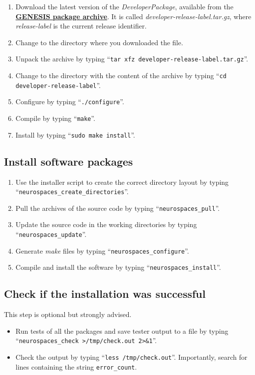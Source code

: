 \documentclass[12pt]{article}
\begin{document}
\begin{enumerate}
   \item Download the latest version of the {\it DeveloperPackage}, available from the \href{http://repo-genesis3.cbi.utsa.edu/src/}{\bf GENESIS package archive}. It is called {\it developer-release-label.tar.gz}, where {\it release-label} is the current release identifier.
   \item Change to the directory where you downloaded the file.
   \item Unpack the archive by typing ``{\tt tar xfz developer-release-label.tar.gz}''.
   \item Change to the directory with the content of the archive by typing ``{\tt cd developer-release-label}''.
   \item Configure by typing ``{\tt ./configure}''.
   \item Compile by typing ``{\tt make}''.
   \item Install by typing ``{\tt sudo make install}''. 
\end{enumerate}

\subsection*{Install software packages}

\begin{enumerate}
   \item Use the installer script to create the correct directory layout by typing ``{\tt neurospaces\_create\_directories}''.
   \item Pull the archives of the source code by typing ``{\tt neurospaces\_pull}''.
   \item Update the source code in the working directories by typing ``{\tt neurospaces\_update}''.
   \item Generate {\it make} files by typing ``{\tt neurospaces\_configure}''.
   \item Compile and install the software by typing ``{\tt neurospaces\_install}''.
\end{enumerate}

\subsection*{Check if the installation was successful}

This step is optional but strongly advised.

\begin{itemize}      
   \item[] Run tests of all the packages and save tester output to a file  by typing ``{\tt neurospaces\_check >/tmp/check.out 2>\&1}''.
   \item[] Check the output by typing ``{\tt less /tmp/check.out}''. Importantly, search for lines containing the string {\tt error\_count}.
\end{itemize}
    
\end{document}
